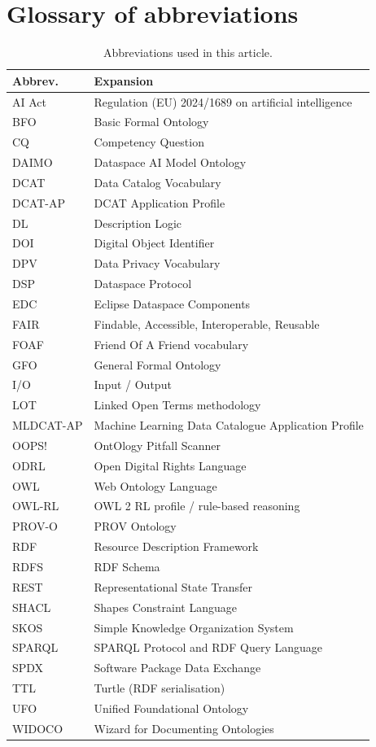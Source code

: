 \documentclass[11pt,a4paper]{article}
\begin{document}
\section{Glossary of abbreviations}\label{app:glossary}

\begin{table}[h]
\small\sf\centering
\caption{Abbreviations used in this article.\label{tab:glossary}}
\begin{tabular}{@{}p{2.2cm}p{10cm}@{}}
\toprule
\textbf{Abbrev.} & \textbf{Expansion} \\
\midrule
AI Act & Regulation (EU) 2024/1689 on artificial intelligence \\
BFO & Basic Formal Ontology \\
CQ & Competency Question \\
DAIMO & Dataspace AI Model Ontology \\
DCAT & Data Catalog Vocabulary \\
DCAT-AP & DCAT Application Profile \\
DL & Description Logic \\
DOI & Digital Object Identifier \\
DPV & Data Privacy Vocabulary \\
DSP & Dataspace Protocol \\
EDC & Eclipse Dataspace Components \\
FAIR & Findable, Accessible, Interoperable, Reusable \\
FOAF & Friend Of A Friend vocabulary \\
GFO & General Formal Ontology \\
I/O & Input / Output \\
LOT & Linked Open Terms methodology \\
MLDCAT-AP & Machine Learning Data Catalogue Application Profile \\
OOPS! & OntOlogy Pitfall Scanner \\
ODRL & Open Digital Rights Language \\
OWL & Web Ontology Language \\
OWL-RL & OWL 2 RL profile / rule-based reasoning \\
PROV-O & PROV Ontology \\
RDF & Resource Description Framework \\
RDFS & RDF Schema \\
REST & Representational State Transfer \\
SHACL & Shapes Constraint Language \\
SKOS & Simple Knowledge Organization System \\
SPARQL & SPARQL Protocol and RDF Query Language \\
SPDX & Software Package Data Exchange \\
TTL & Turtle (RDF serialisation) \\
UFO & Unified Foundational Ontology \\
WIDOCO & Wizard for Documenting Ontologies \\
\bottomrule
\end{tabular}
\end{table}
\end{document}
